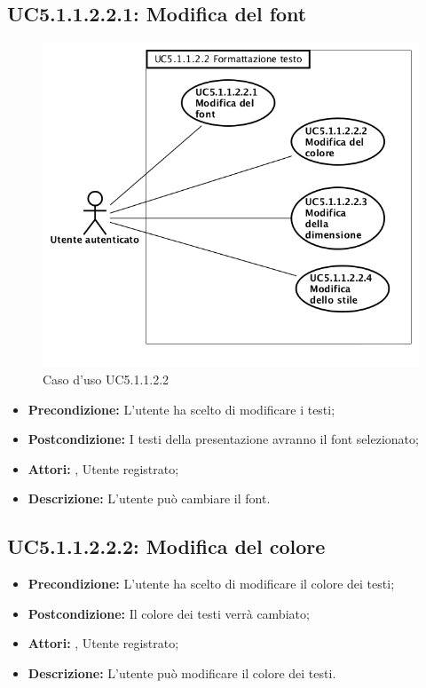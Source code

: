 \subsection{ UC5.1.1.2.2.1: Modifica del font}

\begin{figure}[h]
	\begin{center}
	\includegraphics[scale=0.4]{diagram/UC5-1-1-2-2.png}
	\caption{Caso d'uso UC5.1.1.2.2}
	\end{center}
\end{figure}
\begin{itemize}
	\item \textbf{Precondizione:} L'utente ha scelto di modificare i testi;
	\item \textbf{Postcondizione:} I testi della presentazione avranno il font selezionato;
	\item \textbf{Attori:} , Utente registrato;
	\item \textbf{Descrizione:} L'utente può cambiare il font.
\end{itemize}
\subsection{ UC5.1.1.2.2.2: Modifica del colore}

\begin{itemize}
	\item \textbf{Precondizione:} L'utente ha scelto di modificare il colore dei testi;
	\item \textbf{Postcondizione:} Il colore dei testi verrà cambiato;
	\item \textbf{Attori:} , Utente registrato;
	\item \textbf{Descrizione:} L'utente può modificare il colore dei testi.
\end{itemize}
